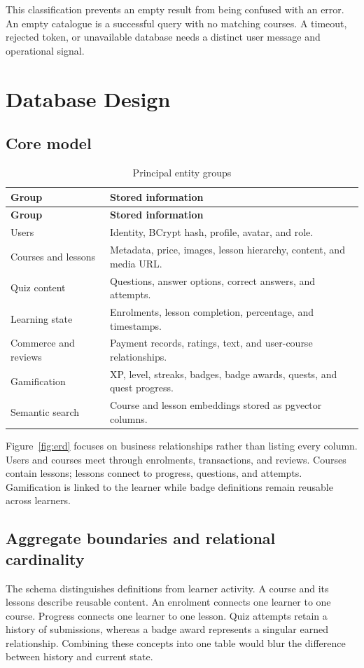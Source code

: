 \documentclass[12pt,a4paper,oneside]{report}
\begin{document}
This classification prevents an empty result from being confused with an error. An
empty catalogue is a successful query with no matching courses. A timeout, rejected
token, or unavailable database needs a distinct user message and operational signal.

\chapter{Database Design}
\section{Core model}
\begin{longtable}{P{0.25\textwidth}P{0.64\textwidth}}
\caption{Principal entity groups}\label{tab:entities}\\\toprule
\textbf{Group} & \textbf{Stored information}\\\midrule\endfirsthead
\toprule\textbf{Group} & \textbf{Stored information}\\\midrule\endhead
Users & Identity, BCrypt hash, profile, avatar, and role.\\
Courses and lessons & Metadata, price, images, lesson hierarchy, content, and media URL.\\
Quiz content & Questions, answer options, correct answers, and attempts.\\
Learning state & Enrolments, lesson completion, percentage, and timestamps.\\
Commerce and reviews & Payment records, ratings, text, and user-course relationships.\\
Gamification & XP, level, streaks, badges, badge awards, quests, and quest progress.\\
Semantic search & Course and lesson embeddings stored as pgvector columns.\\
\bottomrule
\end{longtable}

Figure~\ref{fig:erd} focuses on business relationships rather than listing every
column. Users and courses meet through enrolments, transactions, and reviews. Courses
contain lessons; lessons connect to progress, questions, and attempts. Gamification
is linked to the learner while badge definitions remain reusable across learners.

\erdmodeldiagram

\section{Aggregate boundaries and relational cardinality}
The schema distinguishes definitions from learner activity. A course and its lessons
describe reusable content. An enrolment connects one learner to one course. Progress
connects one learner to one lesson. Quiz attempts retain a history of submissions,
whereas a badge award represents a singular earned relationship. Combining these
concepts into one table would blur the difference between history and current state.
\end{document}

